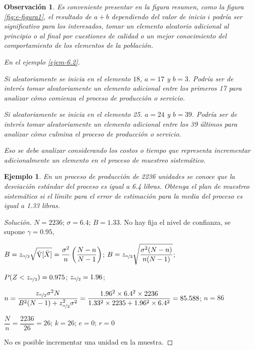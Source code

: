 \documentclass[a5paper,doc,10pt,noapacite]{apa6}
\DeclareMathOperator{\Var}{V}
\newtheorem{observ}{Observación}
\newtheorem{ejem}{Ejemplo}
\begin{document}
{{\begin{observ}
	Es conveniente presentar en la figura resumen, como la figura \eqref{fig:e-figura1}, el resultado de \(a+b\) dependiendo del valor de inicio \(i\) podría ser significativo para los interesados, tomar un elemento aleatorio adicional al principio o al final por cuestiones de calidad o un mejor conocimiento del comportamiento de los elementos de la población.
	
	
	En el ejemplo \eqref{ejem-6.2}.
	
	Si aleatoriamente se inicia en el elemento \(18\), \(a=17\) y \(b=3\). Podría ser de interés tomar aleatoriamente un elemento adicional entre los primeros 17 para analizar cómo comienza el proceso de producción o servicio.
	
	Si aleatoriamente se inicia en el elemento 25. \(a=24\) y \(b=39\). Podría ser de interés tomar aleatoriamente un elemento adicional entre los 39 últimos para analizar cómo culmina el proceso de producción o servicio.
	
	Eso se debe analizar considerando los costos o tiempo que representa incrementar adicionalmente
	un elemento en el proceso de muestreo sistemático.
\end{observ}


\begin{ejem}
	En un proceso de producción de 2236 unidades se conoce que la desviación estándar del proceso es igual a 6.4 libras. Obtenga el plan de muestreo sistemático si el límite para el error de estimación para la media del proceso es igual a 1.33 libras.
\end{ejem}
\begin{proof}[Solución]
		\(N=2236\); \(\sigma=6.4\); \(B=1.33\). No hay fija el nivel de confianza, se supone \(\gamma=0.95\),
		
		\(B=z_{\nicefrac{\alpha}{2}}\sqrt{\hat{\Var}[\bar{X}]}=\dfrac{\sigma^2}{n}\left(\dfrac{N-n}{N-1}\right)\); \(B=z_{\nicefrac{\alpha}{2}}\sqrt{\dfrac{\sigma^2(N-n)}{n(N-1)}}\); 
		
		\(P(Z<z_{\nicefrac{\alpha}{2}})=0.975\); \(z_{\nicefrac{\alpha}{2}}=1.96\);
		
		\(n=\dfrac{z_{\nicefrac{\alpha}{2}}\sigma^2N}{B^2(N-1)+z_{\nicefrac{\alpha}{2}}^2\sigma^2}=\dfrac{1.96^2 \times 6.4^2 \times 2236}{1.33^2 \times 2235+1.96^2 \times 6.4^2}=85.588\); \(n=86\)
		
		\(\dfrac{N}{n}=\dfrac{2236}{26}=26\); \(k=26\); \(e=0\); \(r=0\)
		
		No es posible incrementar una unidad en la muestra.
		

\end{proof}}}
\end{document}

